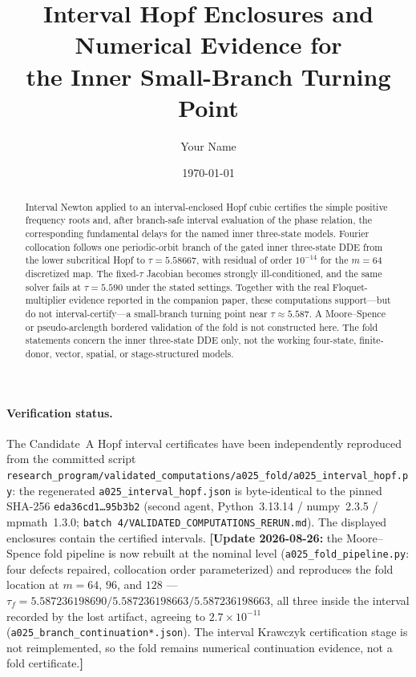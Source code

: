 \documentclass[11pt]{article}
\title{Interval Hopf Enclosures and Numerical Evidence for\\the Inner Small-Branch Turning Point}
\author{Your Name}
\date{\today}
\theoremstyle{definition}
\begin{document}
\maketitle

\begin{abstract}
Interval Newton applied to an interval-enclosed Hopf cubic certifies the simple positive frequency roots and, after branch-safe interval evaluation of the phase relation, the corresponding fundamental delays for the named inner three-state models. Fourier collocation follows one periodic-orbit branch of the gated inner three-state DDE from the lower subcritical Hopf to $\tau=5.58667$, with residual of order $10^{-14}$ for the $m=64$ discretized map. The fixed-$\tau$ Jacobian becomes strongly ill-conditioned, and the same solver fails at $\tau=5.590$ under the stated settings. Together with the real Floquet-multiplier evidence reported in the companion paper, these computations support---but do not interval-certify---a small-branch turning point near $\tau\approx5.587$. A Moore--Spence or pseudo-arclength bordered validation of the fold is not constructed here. The fold statements concern the inner three-state DDE only, not the working four-state, finite-donor, vector, spatial, or stage-structured models.
\end{abstract}

\paragraph{Verification status.} The Candidate~A Hopf interval certificates have been independently reproduced from the committed script \texttt{research\_program/validated\_computations/a025\_fold/a025\_interval\_hopf.py}: the regenerated \texttt{a025\_interval\_hopf.json} is byte-identical to the pinned SHA-256 \texttt{eda36cd1\ldots95b3b2} (second agent, Python~3.13.14 / numpy~2.3.5 / mpmath~1.3.0; \texttt{batch 4/VALIDATED\_COMPUTATIONS\_RERUN.md}). The displayed enclosures contain the certified intervals. \textbf{[Update 2026-08-26:} the Moore--Spence fold pipeline is now rebuilt at the nominal level (\texttt{a025\_fold\_pipeline.py}: four defects repaired, collocation order parameterized) and reproduces the fold location at $m=64$, $96$, and $128$ — $\tau_f = 5.587236198690 / 5.587236198663 / 5.587236198663$, all three inside the interval recorded by the lost artifact, agreeing to $2.7\times10^{-11}$ (\texttt{a025\_branch\_continuation*.json}). The interval Krawczyk certification stage is not reimplemented, so the fold remains numerical continuation evidence, not a fold certificate.\textbf{]}
\end{document}
